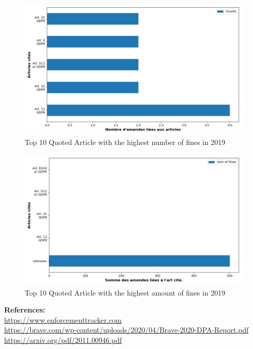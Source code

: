 \documentclass[12pt]{article}
\begin{document}
	\begin{multicols}{2}
	\begin{figure}
		[H]\centering\includegraphics[width=1.0\linewidth]{graphs/top10_quoted_year}
		\caption{Top 10 Quoted Article with the highest number of fines in 2019}
	\end{figure}
	\begin{figure}
		[H]\centering\includegraphics[width=1\linewidth]{graphs/top10_quoted_year_fines}
		\caption{Top 10 Quoted Article with the highest amount of fines in 2019}
	 \end{figure}
	
	\end{multicols}









\vspace*{\fill}
\textbf{References:}\\
\href{https://www.enforcementtracker.com}{https://www.enforcementtracker.com}\\
\href{https://brave.com/wp-content/uploads/2020/04/Brave-2020-DPA-Report.pdf}{https://brave.com/wp-content/uploads/2020/04/Brave-2020-DPA-Report.pdf}\\
\href{https://arxiv.org/pdf/2011.00946.pdf}{https://arxiv.org/pdf/2011.00946.pdf}
\end{document}
